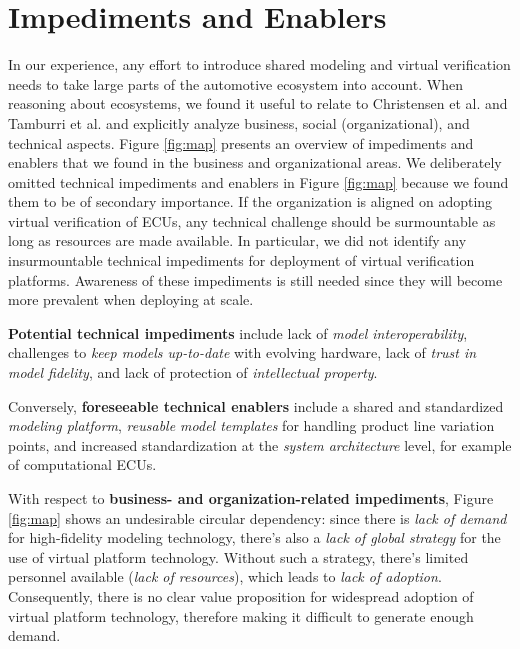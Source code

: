 \section{Impediments and Enablers}\label{sec:impediments_and_enablers}
In our experience, any effort to introduce shared modeling and virtual verification needs to take large parts of the automotive ecosystem into account. 
When reasoning about ecosystems, we found it useful to relate to Christensen et al. \cite{christensen2014analysis} and Tamburri et al. \cite{tamburri2013uncovering} and explicitly analyze business, social (organizational), and technical aspects.
Figure \ref{fig:map} presents an overview of impediments and enablers that we found in the business and organizational areas.
We deliberately omitted technical impediments and enablers in Figure \ref{fig:map} because we found them to be of secondary importance.
If the organization is aligned on adopting virtual verification of ECUs,
any technical challenge should be surmountable as long as resources are made available.
In particular, we did not identify any insurmountable technical impediments for deployment of virtual verification platforms.
Awareness of these impediments is still needed since they will become more prevalent when deploying at scale.

\textbf{Potential technical impediments} include
lack of \emph{model interoperability},
challenges to \emph{keep models up-to-date} with evolving hardware,
lack of \emph{trust in model fidelity},
and lack of protection of \emph{intellectual property}.

Conversely, \textbf{foreseeable technical enablers} include a shared and standardized \emph{modeling platform},
\emph{reusable model templates} for handling product line variation points,
and increased standardization at the \emph{system architecture} level, for example of computational ECUs.



With respect to \textbf{business- and organization-related impediments}, Figure \ref{fig:map} shows an undesirable circular dependency:
since there is \emph{lack of demand} for high-fidelity modeling technology,
there's also a \emph{lack of global strategy} for the use of virtual platform technology.
Without such a strategy, there's limited personnel available (\emph{lack of resources}),
which leads to \emph{lack of adoption}.
Consequently, there is no clear value proposition for widespread adoption of virtual platform technology, therefore making it difficult to generate enough demand.

